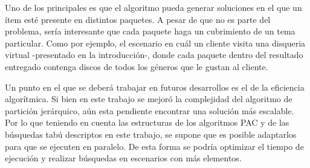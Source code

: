 Uno de los principales es que el algoritmo pueda generar soluciones en el que un ítem esté presente en distintos paquetes. A pesar de que no es parte del problema, sería interesante que cada paquete haga un cubrimiento de un tema particular. Como por ejemplo, el escenario en cuál un cliente visita una disqueria virtual -presentado en la introducción-, donde cada paquete dentro del resultado entregado contenga discos de todos los géneros que le gustan al cliente.

Un punto en el que se deberá trabajar en futuros desarrollos es el de la eficiencia algorítmica. Si bien en este trabajo se mejoró la complejidad del algoritmo de partición jerárquico, aún esta pendiente encontrar una solución más escalable. Por lo que teniendo en cuenta las estructuras de los algoritmos PAC y de las búsquedas tabú descriptos en este trabajo, se supone que es posible adaptarlos para que se ejecuten en paralelo. De esta forma se podría optimizar el tiempo de ejecución y realizar búsquedas en escenarios con más elementos.